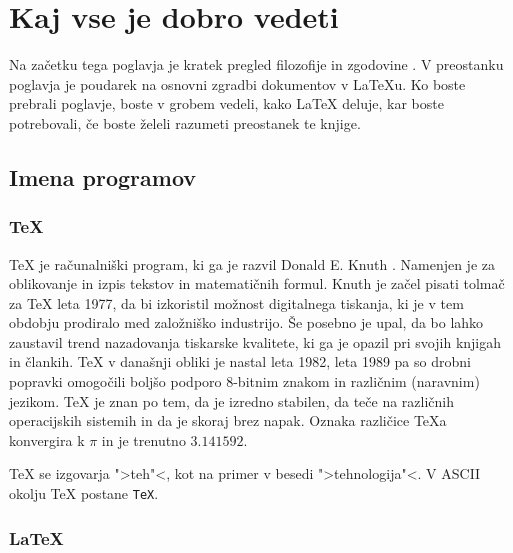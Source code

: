  
\chapter{Kaj vse je dobro vedeti}
\begin{intro}
Na začetku tega poglavja je kratek pregled filozofije in 
zgodovine \LaTeXe{}. V preostanku poglavja je poudarek
na osnovni zgradbi dokumentov v \LaTeX{}u. 
Ko boste prebrali poglavje, boste v grobem vedeli, kako \LaTeX{} deluje,
kar boste potrebovali, če boste želeli razumeti preostanek te knjige.
\end{intro}

\section{Imena programov}
\subsection{\TeX}
 
\TeX{} je računalniški program, ki ga je razvil Donald
E. Knuth \cite{texbook}. Namenjen je za oblikovanje in izpis tekstov in 
matematičnih formul. Knuth je začel pisati tolmač za \TeX{} leta 1977, da bi 
izkoristil možnost digitalnega tiskanja, ki je v tem obdobju prodiralo med 
založniško industrijo. Še posebno je upal, da bo lahko zaustavil trend nazadovanja 
tiskarske kvalitete, ki ga je opazil pri svojih knjigah in člankih. \TeX{} v današnji obliki 
je nastal leta 1982, leta 1989 pa so drobni popravki omogočili 
boljšo podporo 8-bitnim znakom in različnim (naravnim) jezikom. \TeX{} je znan po tem, da je izredno 
stabilen, da teče na različnih operacijskih sistemih in da je 
skoraj brez napak. Oznaka različice \TeX{a}  
konvergira k $\pi$ in je trenutno
$3.141592$.

\TeX{} se izgovarja ">teh"<, kot na primer v besedi 
">tehnologija"<. V ASCII okolju \TeX{} postane \texttt{TeX}.
                                                                     
\subsection{\LaTeX}
 
